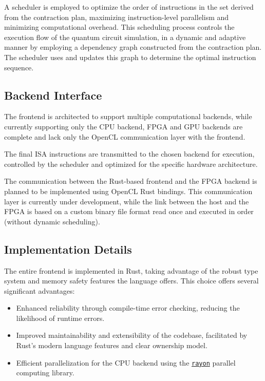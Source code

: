 \documentclass[12pt,oneside,a4paper]{article}
\begin{document}
A scheduler is employed to optimize the order of instructions in the set derived from the contraction plan, maximizing instruction-level parallelism and minimizing computational overhead. This scheduling process controls the execution flow of the quantum circuit simulation, in a dynamic and adaptive manner by employing a dependency graph constructed from the contraction plan. The scheduler uses and updates this graph to determine the optimal instruction sequence.

\subsection{Backend Interface}

The frontend is architected to support multiple computational backends, while currently supporting only the CPU backend, FPGA and GPU backends are complete and lack only the OpenCL communication layer with the frontend.

The final ISA instructions are transmitted to the chosen backend for execution, controlled by the scheduler and optimized for the specific hardware architecture.

The communication between the Rust-based frontend and the FPGA backend is planned to be implemented using OpenCL Rust bindings. This communication layer is currently under development, while the link between the host and the FPGA is based on a custom binary file format read once and executed in order (without dynamic scheduling).

\subsection{Implementation Details}

The entire frontend is implemented in Rust, taking advantage of the robust type system and memory safety features the language offers. This choice offers several significant advantages:

\begin{itemize}
    \item Enhanced reliability through compile-time error checking, reducing the likelihood of runtime errors.
    \item Improved maintainability and extensibility of the codebase, facilitated by Rust's modern language features and clear ownership model.
    \item Efficient parallelization for the CPU backend using the \href{https://github.com/rayon-rs/rayon}{\texttt{rayon}} parallel computing library.
\end{itemize}
\end{document}
